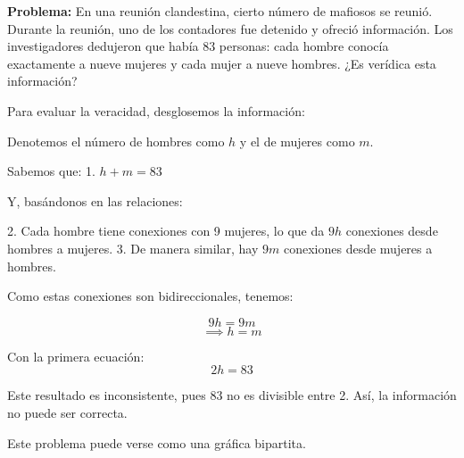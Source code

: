 \documentclass{article}
\begin{document}
\textbf{Problema:}
En una reunión clandestina, cierto número de mafiosos se reunió. Durante la reunión, uno de los contadores fue detenido y ofreció información. Los investigadores dedujeron que había 83 personas: cada hombre conocía exactamente a nueve mujeres y cada mujer a nueve hombres. ¿Es verídica esta información?

\bigskip

Para evaluar la veracidad, desglosemos la información:

Denotemos el número de hombres como \( h \) y el de mujeres como \( m \).

Sabemos que:
1. \( h + m = 83 \)

Y, basándonos en las relaciones:

2. Cada hombre tiene conexiones con 9 mujeres, lo que da \( 9h \) conexiones desde hombres a mujeres.
3. De manera similar, hay \( 9m \) conexiones desde mujeres a hombres.

Como estas conexiones son bidireccionales, tenemos:

\[ 9h = 9m \]
\[ \implies h = m \]

Con la primera ecuación:
\[ 2h = 83 \]

Este resultado es inconsistente, pues 83 no es divisible entre 2. Así, la información no puede ser correcta.


Este problema puede verse como una gráfica bipartita.
\end{document}
